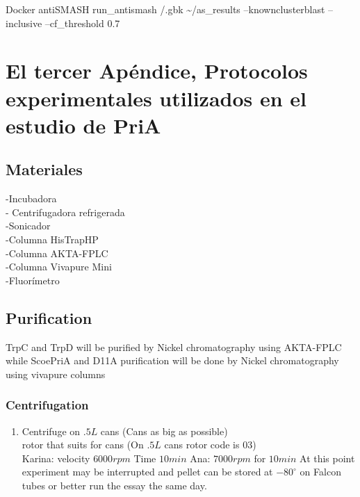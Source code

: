 \documentclass[12pt,twoside]{reedthesis}
\providecommand{\tightlist}{%
  \setlength{\itemsep}{0pt}\setlength{\parskip}{0pt}}
\begin{document}
  Docker antiSMASH run\_antismash /.gbk \textasciitilde{}/as\_results
  --knownclusterblast --inclusive --cf\_threshold 0.7
  
  \chapter{El tercer Apéndice, Protocolos experimentales utilizados en el
  estudio de
  PriA}\label{el-tercer-apendice-protocolos-experimentales-utilizados-en-el-estudio-de-pria}
  
  \section{Materiales}\label{materiales}
  
  -Incubadora\\
  - Centrifugadora refrigerada\\
  -Sonicador\\
  -Columna HisTrapHP\\
  -Columna AKTA-FPLC\\
  -Columna Vivapure Mini\\
  -Fluorímetro
  
  \section{Purification}\label{purification}
  
  TrpC and TrpD will be purified by Nickel chromatography using AKTA-FPLC
  while ScoePriA and D11A purification will be done by Nickel
  chromatography using vivapure columns
  
  \subsection{Centrifugation}\label{centrifugation}
  
  \begin{enumerate}
  \def\labelenumi{\arabic{enumi}.}
  \tightlist
  \item
    Centrifuge on \(.5L\) cans (Cans as big as possible)\\
    rotor that suits for cans (On \(.5L\) cans rotor code is 03)\\
    Karina: velocity \(6000 rpm\) Time \(10 min\) Ana: \(7000rpm\) for
    \(10 min\) At this point experiment may be interrupted and pellet can
    be stored at \(-80^{\circ}\) on Falcon tubes or better run the essay
    the same day.
  \end{enumerate}
  
\end{document}

